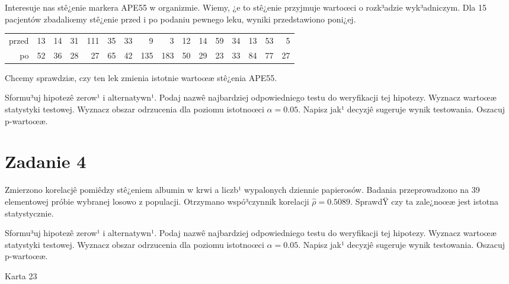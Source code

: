 \documentclass[a4paper,12pt]{article}
\begin{document}
  Interesuje nas stê¿enie markera APE55  w organizmie. 
  Wiemy, ¿e to stê¿enie przyjmuje wartoœci o rozk³adzie wyk³adniczym. 
  Dla 15 pacjentów zbadaliœmy stê¿enie przed i po podaniu pewnego leku, 
  wyniki przedstawiono poni¿ej.
  
  \vspace{0.5cm} 
  \noindent\begin{center} 
\begin{tabular}{rrrrrrrrrrrrrrrr}
  \hline
  \hline
przed & 13 & 14 & 31 & 111 & 35 & 33 & 9 & 3 & 12 & 14 & 59 & 34 & 13 & 53 & 5 \\
  po & 52 & 36 & 28 & 27 & 65 & 42 & 135 & 183 & 50 & 29 & 23 & 33 & 84 & 77 & 27 \\
   \hline
\end{tabular}
 
  \end{center} 
  \vspace{0.5cm}
  
  Chcemy sprawdziæ, czy ten lek zmienia istotnie wartoœæ stê¿enia APE55.
  
  Sformu³uj hipotezê zerow¹ i alternatywn¹. 
  Podaj nazwê najbardziej odpowiedniego testu do weryfikacji tej hipotezy. 
  Wyznacz wartoœæ statystyki testowej. 
  Wyznacz obszar odrzucenia dla poziomu istotnoœci $\alpha=0.05$. 
  Napisz jak¹ decyzjê sugeruje wynik testowania. Oszacuj p-wartoœæ. \vspace{1cm} 

  \section*{Zadanie 4}
     
     Zmierzono korelacjê pomiêdzy stê¿eniem albumin w krwi a liczb¹ wypalonych dziennie papierosów. 
     Badania przeprowadzono na 39 elementowej próbie wybranej losowo z populacji. 
     Otrzymano wspó³czynnik korelacji $\hat\rho = 0.5089 $. 
     SprawdŸ czy ta zale¿noœæ jest istotna statystycznie. 
     
     Sformu³uj hipotezê zerow¹ i alternatywn¹. 
     Podaj nazwê najbardziej odpowiedniego testu do weryfikacji tej hipotezy. 
     Wyznacz wartoœæ statystyki testowej. 
     Wyznacz obszar odrzucenia dla poziomu istotnoœci $\alpha=0.05$. 
     Napisz jak¹ decyzjê sugeruje wynik testowania. 
     Oszacuj p-wartoœæ. \vspace{1cm} 

  \clearpage  Karta  23  
\end{document}
